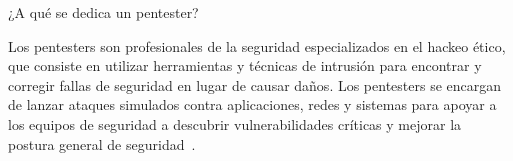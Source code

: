 ¿A qué se dedica un pentester?

Los pentesters son profesionales de la seguridad especializados en el hackeo ético, que consiste en utilizar herramientas y técnicas de intrusión para encontrar y corregir fallas de seguridad en lugar de causar daños. Los pentesters se encargan de lanzar ataques simulados contra aplicaciones, redes y sistemas para apoyar a los equipos de seguridad a descubrir vulnerabilidades críticas y mejorar la postura general de seguridad~\cite{Pen}.
